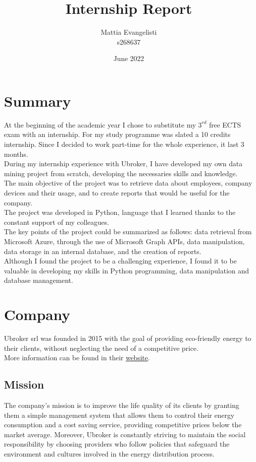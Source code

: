 \documentclass[12pt, a4paper, oneside]{article}
\title{\huge Internship Report}
\author{Mattia Evangelisti \\ s268637}
\date{June 2022}
\begin{document}
\begin{titlepage}
    \maketitle
\end{titlepage}

\tableofcontents
\clearpage\null\newpage


\newpage
\section{Summary}
At the beginning of the academic year I chose to substitute my $3^{rd}$ free ECTS exam with an internship. For my study programme was slated a 10 credits internship. Since I decided to work part-time
for the whole experience, it last 3 months.\\
During my internship experience with Ubroker, I have developed my own data mining project from scratch, developing the necessaries skills and knowledge.\\
The main objective of the project was to retrieve data about employees, company devices and their usage, and to create reports that would be useful for the company.\\
The project was developed in Python, language that I learned thanks to the constant support of my colleagues.\\
The key points of the project could be summarized as follows: data retrieval from Microsoft Azure, through the use of Microsoft Graph APIs, data manipulation, data storage in an internal database,
and the creation of reports.\\
Although I found the project to be a challenging experience, I found it to be valuable in developing my skills in Python programming, data manipulation and database management.\\


\newpage
\section{Company}
Ubroker srl was founded in 2015 with the goal of providing eco-friendly energy to their clients, without neglecting the need of a competitive price.\\
More information can be found in their \href{https://ubroker.it/}{website}.
\subsection{Mission}
The company's mission is to improve the life quality of its clients by granting them a simple management system that allows them to control their energy consumption and a cost saving service, providing 
competitive prices below the market average. Moreover, Ubroker is constantly striving to maintain the social responsibility by choosing providers who follow policies that safeguard the environment and cultures
involved in the energy distribution process.
\end{document}
